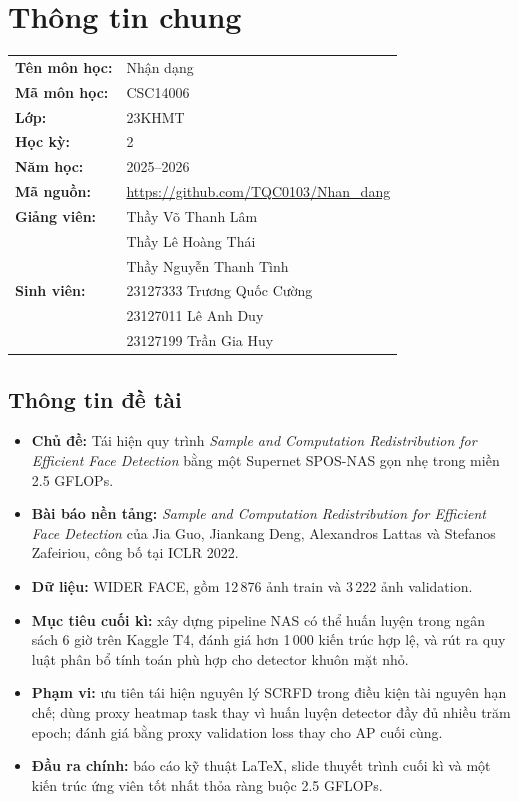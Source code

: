 \chapter*{Thông tin chung}

\noindent
\begin{tabular}{@{}l l@{}}
  \textbf{Tên môn học:} & Nhận dạng \\
  \textbf{Mã môn học:} & CSC14006 \\
  \textbf{Lớp:} & 23KHMT \\
  \textbf{Học kỳ:} & 2 \\
  \textbf{Năm học:} & 2025--2026 \\
  \textbf{Mã nguồn:} & \url{https://github.com/TQC0103/Nhan_dang} \\[4pt]
  \textbf{Giảng viên:} & Thầy Võ Thanh Lâm \\
  & Thầy Lê Hoàng Thái \\
  & Thầy Nguyễn Thanh Tình \\[6pt]
  \textbf{Sinh viên:} & 23127333 Trương Quốc Cường \\
  & 23127011 Lê Anh Duy \\
  & 23127199 Trần Gia Huy \\
\end{tabular}

\section*{Thông tin đề tài}
{}

\begin{itemize}
  \item \textbf{Chủ đề:} Tái hiện quy trình \textit{Sample and Computation Redistribution for Efficient Face Detection} bằng một Supernet SPOS-NAS gọn nhẹ trong miền 2.5 GFLOPs.
  \item \textbf{Bài báo nền tảng:} \textit{Sample and Computation Redistribution for Efficient Face Detection} của Jia Guo, Jiankang Deng, Alexandros Lattas và Stefanos Zafeiriou, công bố tại ICLR 2022. \cite{guo2022scrfd}
  \item \textbf{Dữ liệu:} WIDER FACE, gồm 12\,876 ảnh train và 3\,222 ảnh validation. \cite{yang2016widerface}
  \item \textbf{Mục tiêu cuối kì:} xây dựng pipeline NAS có thể huấn luyện trong ngân sách 6 giờ trên Kaggle T4, đánh giá hơn 1\,000 kiến trúc hợp lệ, và rút ra quy luật phân bổ tính toán phù hợp cho detector khuôn mặt nhỏ.
  \item \textbf{Phạm vi:} ưu tiên tái hiện nguyên lý SCRFD trong điều kiện tài nguyên hạn chế; dùng proxy heatmap task thay vì huấn luyện detector đầy đủ nhiều trăm epoch; đánh giá bằng proxy validation loss thay cho AP cuối cùng.
  \item \textbf{Đầu ra chính:} báo cáo kỹ thuật LaTeX, slide thuyết trình cuối kì và một kiến trúc ứng viên tốt nhất thỏa ràng buộc 2.5 GFLOPs.
\end{itemize}

